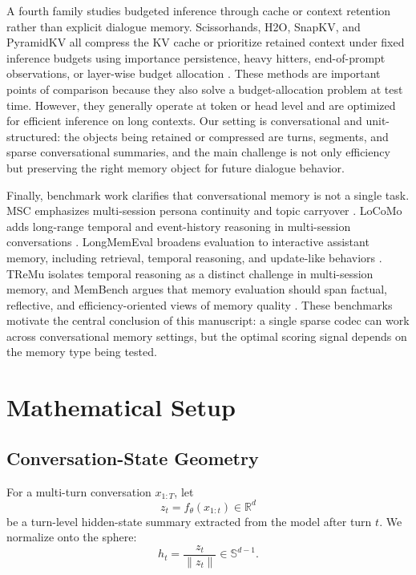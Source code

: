 \documentclass[conference]{IEEEtran}
\newcommand{\R}{\mathbb{R}}
\newcommand{\Sph}{\mathbb{S}}
\begin{document}
A fourth family studies budgeted inference through cache or context retention rather than explicit dialogue memory. Scissorhands, H2O, SnapKV, and PyramidKV all compress the KV cache or prioritize retained context under fixed inference budgets using importance persistence, heavy hitters, end-of-prompt observations, or layer-wise budget allocation \cite{scissorhands,h2o,snapkv,pyramidkv}. These methods are important points of comparison because they also solve a budget-allocation problem at test time. However, they generally operate at token or head level and are optimized for efficient inference on long contexts. Our setting is conversational and unit-structured: the objects being retained or compressed are turns, segments, and sparse conversational summaries, and the main challenge is not only efficiency but preserving the right memory object for future dialogue behavior.

Finally, benchmark work clarifies that conversational memory is not a single task. MSC emphasizes multi-session persona continuity and topic carryover \cite{msc}. LoCoMo adds long-range temporal and event-history reasoning in multi-session conversations \cite{locomo}. LongMemEval broadens evaluation to interactive assistant memory, including retrieval, temporal reasoning, and update-like behaviors \cite{longmemeval}. TReMu isolates temporal reasoning as a distinct challenge in multi-session memory, and MemBench argues that memory evaluation should span factual, reflective, and efficiency-oriented views of memory quality \cite{tremu,membench}. These benchmarks motivate the central conclusion of this manuscript: a single sparse codec can work across conversational memory settings, but the optimal scoring signal depends on the memory type being tested.

\section{Mathematical Setup}
\subsection{Conversation-State Geometry}
For a multi-turn conversation $x_{1:T}$, let
\begin{equation}
z_t = f_\theta(x_{1:t}) \in \R^d
\end{equation}
be a turn-level hidden-state summary extracted from the model after turn $t$. We normalize onto the sphere:
\begin{equation}
h_t = \frac{z_t}{\lVert z_t \rVert} \in \Sph^{d-1}.
\end{equation}
\end{document}
